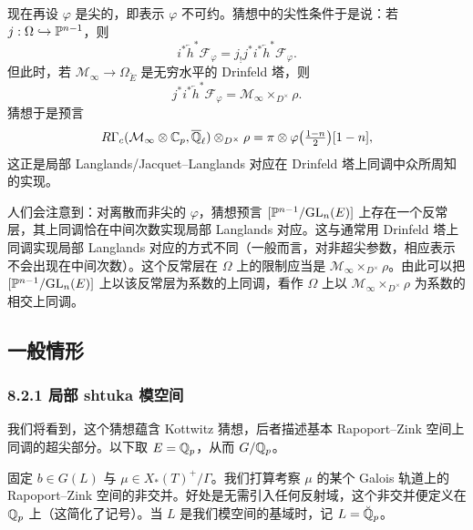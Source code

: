 现在再设 $\varphi$ 是尖的，即表示 $\varphi$ 不可约。猜想中的尖性条件于是说：若 $j:\Omega\hookrightarrow\mathbb{P}^{n-1}$，则
\[
i^*\overleftarrow{h}^*\mathscr{F}_{\varphi}=j_!j^*i^*\overleftarrow{h}^*\mathscr{F}_{\varphi}.
\]
但此时，若 $\mathcal{M}_\infty\to\Omega_{\breve{E}}$ 是无穷水平的 Drinfeld 塔，则
\[
j^*i^*\overleftarrow{h}^*\mathscr{F}_{\varphi}=\mathcal{M}_\infty\times_{D^\times}\rho.
\]
猜想于是预言
\[
R\Gamma_c(\mathcal{M}_\infty\otimes\mathbb{C}_p,\overline{\mathbb{Q}}_\ell)\otimes_{D^\times}\rho=\pi\otimes\varphi\big(\tfrac{1-n}{2}\big)[1-n],
\]
这正是局部 Langlands/Jacquet--Langlands 对应在 Drinfeld 塔上同调中众所周知的实现。

\begin{remark}\label{rem:8.1}
人们会注意到：对离散而非尖的 $\varphi$，猜想预言 $[\mathbb{P}^{n-1}/\mathrm{GL}_n(E)]$ 上存在一个反常层，其上同调恰在中间次数实现局部 Langlands 对应。这与通常用 Drinfeld 塔上同调实现局部 Langlands 对应的方式不同（一般而言，对非超尖参数，相应表示不会出现在中间次数）。这个反常层在 $\Omega$ 上的限制应当是 $\mathcal{M}_\infty\times_{D^\times}\rho$。由此可以把 $[\mathbb{P}^{n-1}/\mathrm{GL}_n(E)]$ 上以该反常层为系数的上同调，看作 $\Omega$ 上以 $\mathcal{M}_\infty\times_{D^\times}\rho$ 为系数的相交上同调。
\end{remark}

\subsection{一般情形}


\subsubsection*{8.2.1 局部 shtuka 模空间}

我们将看到，这个猜想蕴含 Kottwitz 猜想，后者描述基本 Rapoport--Zink 空间上同调的超尖部分。以下取 $E=\mathbb{Q}_p$，从而 $G/\mathbb{Q}_p$。

固定 $b\in G(L)$ 与 $\mu\in X_*(T)^+/\Gamma$。我们打算考察 $\mu$ 的某个 Galois 轨道上的 Rapoport--Zink 空间的非交并。好处是无需引入任何反射域，这个非交并便定义在 $\mathbb{Q}_p$ 上（这简化了记号）。当 $L$ 是我们模空间的基域时，记 $L=\breve{\mathbb{Q}}_p$。


